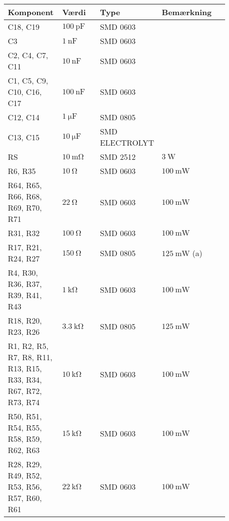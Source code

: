 \begin{table}[h!]
\small
\label{tab:stykliste_diskret}
\begin{threeparttable}
\begin{tabular}{p{0.25\linewidth}p{0.2\linewidth}p{0.25\linewidth}p{0.15\linewidth}p{0.05\linewidth}}
\toprule
\multicolumn{1}{l}{\textbf{Komponent}}  &
\multicolumn{1}{l}{\textbf{Værdi}}      &
\multicolumn{1}{l}{\textbf{Type}}       &
\multicolumn{1}{l}{\textbf{Bemærkning}} &  \\ 
\hline
C18, C19                  & $\SI{100}{\pico\farad}$ & SMD 0603       &   \\
C3                        & $\SI{1}{\nano\farad}$   & SMD 0603       &   \\
C2, C4, C7, C11           & $\SI{10}{\nano\farad}$  & SMD 0603       &   \\
C1, C5, C9, C10, C16, C17 & $\SI{100}{\nano\farad}$ & SMD 0603       &   \\
C12, C14                  & $\SI{1}{\micro\farad}$  & SMD 0805       &   \\
C13, C15                          & $\SI{10}{\micro\farad}$ & SMD ELECTROLYT &   \\
\midrule
RS                                & $\SI{10}{\milli\ohm}$ & SMD 2512 &  $\SI{3}{\watt}$    \\
R6, R35                           & $\SI{10}{\ohm}$  & SMD 0603 & $\SI{100}{\milli\watt}$  \\
R64, R65, R66, R68, R69, R70, R71 & $\SI{22}{\ohm}$  & SMD 0603 &  $\SI{100}{\milli\watt}$ \\
R31, R32                          & $\SI{100}{\ohm}$ & SMD 0603 & $\SI{100}{\milli\watt}$  \\
R17, R21, R24, R27                & $\SI{150}{\ohm}$ & SMD 0805 & $\SI{125}{\milli\watt}$ (a) \\
R4, R30, R36, R37, R39, R41, R43  & $\SI{1}{\kilo\ohm}$ & SMD 0603 & $\SI{100}{\milli\watt}$  \\
R18, R20, R23, R26 & $\SI{3.3}{\kilo\ohm}$ & SMD 0805 & $\SI{125}{\milli\watt}$  \\
R1, R2, R5, R7, R8, R11, R13, R15, R33, R34, R67, R72, R73, R74 & $\SI{10}{\kilo\ohm}$ & SMD 0603 & $\SI{100}{\milli\watt}$  \\
R50, R51, R54, R55, R58, R59, R62, R63 & $\SI{15}{\kilo\ohm}$ & SMD 0603 & $\SI{100}{\milli\watt}$  \\
R28, R29, R49, R52, R53, R56, R57, R60, R61 & $\SI{22}{\kilo\ohm}$ & SMD 0603 & $\SI{100}{\milli\watt}$  \\

\end{tabular}
\end{threeparttable}
\end{table}
